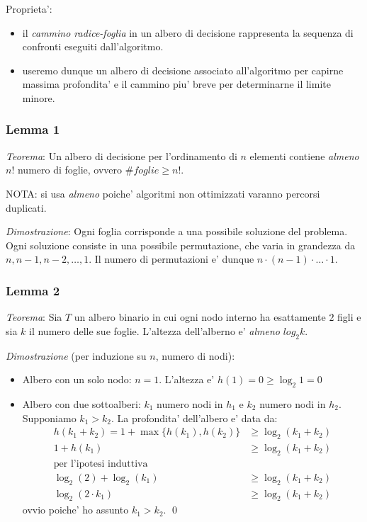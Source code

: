 \documentclass{article}
\begin{document}
Proprieta':
\begin{itemize}
  \item il \emph{cammino radice-foglia} in un albero di decisione rappresenta
    la sequenza di confronti eseguiti dall'algoritmo.
  \item useremo dunque un albero di decisione associato all'algoritmo per capirne
    massima profondita' e il cammino piu' breve per determinarne il limite minore.
\end{itemize}

\subsubsection{Lemma 1}

\emph{Teorema}: Un albero di decisione per l'ordinamento di $n$ elementi
contiene \emph{almeno} $n!$ numero di foglie, ovvero $\# foglie \geq n!$.

NOTA: si usa \emph{almeno} poiche' algoritmi non ottimizzati varanno percorsi
duplicati.

\emph{Dimostrazione}: Ogni foglia corrisponde a una possibile soluzione del
problema. Ogni soluzione consiste in una possibile permutazione, che varia in
grandezza da $n, n-1, n-2, \ldots, 1$. Il numero di permutazioni e' dunque
$n \cdot (n-1) \cdot \ldots \cdot 1$.

\subsubsection{Lemma 2}

\emph{Teorema}: Sia $T$ un albero binario in cui ogni nodo interno ha esattamente
$2$ figli e sia $k$ il numero delle sue foglie. L'altezza dell'alberno e'
\emph{almeno} $log_2 k$.

\emph{Dimostrazione} (per induzione su $n$, numero di nodi):
\begin{itemize}
  \item Albero con un solo nodo: $n = 1$. L'altezza e' $h(1) = 0 \geq \log_2 1 = 0$
  \item Albero con due sottoalberi: $k_1$ numero nodi in $h_1$ e $k_2$ numero nodi in $h_2$.
    Supponiamo $k_1 > k_2$. La profondita' dell'albero e' data da:
    \begin{equation*}
    \begin{split}
      h(k_1 + k_2) = 1 + \max\{h(k_1), h(k_2)\} &\geq \log_2(k_1 + k_2) \\
      1 + h(k_1) &\geq \log_2(k_1 + k_2) \\
      \text{per l'ipotesi induttiva} \\
      \log_2(2) + \log_2(k_1) &\geq \log_2(k_1 + k_2) \\
      \log_2(2 \cdot k_1) &\geq \log_2(k_1 + k_2)
    \end{split}
    \end{equation*}
    ovvio poiche' ho assunto $k_1 > k_2$. \qed
\end{itemize}
\end{document}
